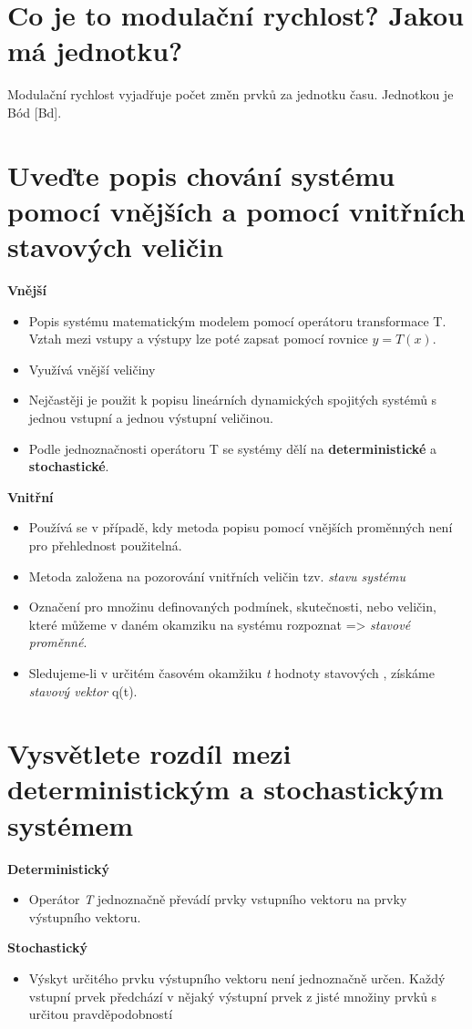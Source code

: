 \section{Co je to modulační rychlost? Jakou má jednotku?}
Modulační rychlost vyjadřuje počet změn prvků za jednotku času. Jednotkou je Bód [Bd].

\section{Uveďte popis chování systému pomocí vnějších a pomocí vnitřních stavových veličin}
\textbf{Vnější}
\begin{itemize}
    \item Popis systému matematickým modelem pomocí operátoru transformace T. Vztah mezi vstupy a výstupy lze poté zapsat pomocí rovnice $y=T(x)$.
    \item Využívá vnější veličiny
    \item Nejčastěji je použit k popisu lineárních dynamických  spojitých systémů s jednou vstupní a jednou výstupní veličinou.
    \item Podle jednoznačnosti operátoru T se systémy dělí na \textbf{deterministické} a \textbf{stochastické}.
    
\end{itemize}

\textbf{Vnitřní}
\begin{itemize}
    \item Používá se v případě, kdy metoda popisu pomocí vnějších proměnných není pro přehlednost použitelná.
    \item Metoda založena na pozorování vnitřních veličin tzv. \textit{stavu systému}
    \item Označení pro množinu definovaných podmínek, skutečnosti, nebo veličin, které můžeme v daném okamziku na systému rozpoznat => \textit{stavové proměnné}.
    \item Sledujeme-li v určitém časovém okamžiku \textit{t} hodnoty stavových , získáme \textit{stavový vektor} q(t).
\end{itemize}

\section{Vysvětlete rozdíl mezi deterministickým a stochastickým systémem}

\textbf{Deterministický}
\begin{itemize}
    \item Operátor \emph{T} jednoznačně převádí prvky vstupního vektoru na prvky výstupního vektoru.

\end{itemize}
\textbf{Stochastický}
\begin{itemize}
    \item Výskyt určitého prvku výstupního vektoru není jednoznačně určen.
    Každý vstupní prvek předchází v nějaký výstupní prvek z jisté množiny prvků s určitou pravděpodobností
    
\end{itemize}